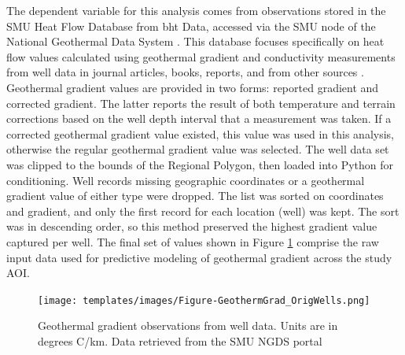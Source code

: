 The dependent variable for this analysis comes from observations stored in the SMU Heat Flow Database from \acrlong{bht} Data, accessed via the SMU node of the National Geothermal Data System \citep{smu_geothermal_2021}. This database focuses specifically on heat flow values calculated using geothermal gradient and conductivity measurements from well data in journal articles, books, reports, and from other sources \citep{blackwell_geothermal_2014}. Geothermal gradient values are provided in two forms: reported gradient and corrected gradient. The latter reports the result of both temperature and terrain corrections based on the well depth interval that a measurement was taken. If a corrected geothermal gradient value existed, this value was used in this analysis, otherwise the regular geothermal gradient value was selected. The well data set was clipped to the bounds of the Regional Polygon, then loaded into Python for conditioning. Well records missing geographic coordinates or a geothermal gradient value of either type were dropped. The list was sorted on coordinates and gradient, and only the first record for each location (well) was kept. The sort was in descending order, so this method preserved the highest gradient value captured per well. The final set of values shown in Figure \ref{fig:feat_geotherm_gradient} comprise the raw input data used for predictive modeling of geothermal gradient across the study AOI.

\begin{figure}[!htp]
\centering
\texttt{[image: templates/images/Figure-GeothermGrad\_OrigWells.png]}
\caption[Geothermal gradient data layer]{Geothermal gradient observations from well data. Units are in degrees C/km. Data retrieved from the SMU NGDS portal \protect\citep{smu_geothermal_2021}}
\label{fig:feat_geotherm_gradient}
\end{figure}